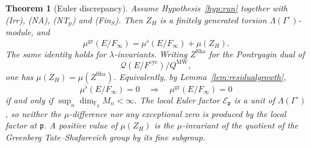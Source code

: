 \documentclass[11pt]{article}
\newtheorem{theorem}{Theorem}[section]
\theoremstyle{definition}
\theoremstyle{remark}
\newcommand{\F}{\mathbb{F}}
\newcommand{\Sha}{\operatorname{Sha}}
\newcommand{\cyc}{\mathrm{cyc}}
\newcommand{\gr}{\mathrm{gr}}
\newcommand{\flatp}{\flat}
\newcommand{\pp}{\mathfrak{p}}
\newcommand{\cE}{\mathcal{E}}
\newcommand{\cQ}{\mathcal{Q}}
\newcommand{\Lam}{\Lambda}
\newcommand{\Gam}{\Gamma^{\circ}}
\begin{document}
\begin{theorem}[Euler discrepancy]
\label{thm:compare}
Assume Hypothesis~\ref{hyp:run} together with \textup{(Irr)}, \textup{(NA)}, \textup{(NT\(_p\))} and \textup{(Fin\(_S\))}. Then \(Z_H\) is a finitely generated torsion \(\Lam(\Gam)\)-module, and
\begin{equation}
\label{eq:add}
\mu^{\gr}(E/F_\infty)
=
\mu^{\flatp}(E/F_\infty)
+
\mu(Z_H).
\end{equation}
The same identity holds for \(\lambda\)-invariants. Writing \(Z^{\Sha}\) for the Pontryagin dual of
\[
\cQ(E/F^{\cyc})\big/Q^{\mathrm{MW}},
\]
one has \(\mu(Z_H)=\mu(Z^{\Sha})\). Equivalently, by Lemma~\ref{lem:residualgrowth},
\begin{equation}
\label{eq:force}
\mu^{\flatp}(E/F_\infty)=0
\quad\Longrightarrow\quad
\mu^{\gr}(E/F_\infty)=0
\end{equation}
if and only if \(\sup_n\dim_{\F_p} M_n<\infty\). The local Euler factor \(\cE_{\pp}\) is a unit of \(\Lam(\Gam)\), so neither the \(\mu\)-difference nor any exceptional zero is produced by the local factor at \(\pp\). A positive value of \(\mu(Z_H)\) is the \(\mu\)-invariant of the quotient of the Greenberg Tate--Shafarevich group by its fine subgroup.
\end{theorem}
\end{document}
